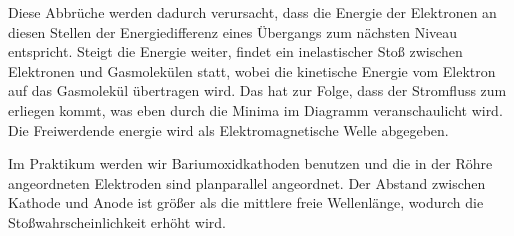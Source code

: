 \documentclass{article}
\begin{document}
Diese Abbrüche werden dadurch verursacht, dass die Energie der Elektronen an diesen Stellen der Energiedifferenz eines Übergangs zum nächsten Niveau entspricht. Steigt die Energie weiter, findet ein inelastischer Stoß zwischen Elektronen und Gasmolekülen statt, wobei die kinetische Energie vom Elektron auf das Gasmolekül übertragen wird. Das hat zur Folge, dass der Stromfluss zum erliegen kommt, was eben durch die Minima im Diagramm veranschaulicht wird. Die Freiwerdende energie wird als Elektromagnetische Welle abgegeben.


Im Praktikum werden wir Bariumoxidkathoden benutzen und die in der Röhre angeordneten Elektroden sind planparallel angeordnet. Der Abstand zwischen Kathode und Anode ist größer als die mittlere freie Wellenlänge, wodurch die Stoßwahrscheinlichkeit erhöht wird.
\end{document}
